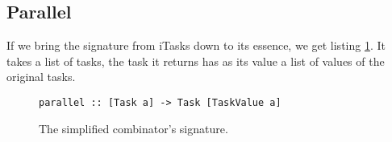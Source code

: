 \subsection{Parallel}
If we bring the  signature from iTasks down to its essence, we get listing \ref{lst:clean_parallel}. It takes a list of tasks, the task it returns has as its value a list of values of the original tasks.

\begin{figure}[ht]
\centering
\begin{verbatim}
parallel :: [Task a] -> Task [TaskValue a]
\end{verbatim}
\caption{The simplified  combinator's signature.}
\label{lst:clean_parallel}
\end{figure}
